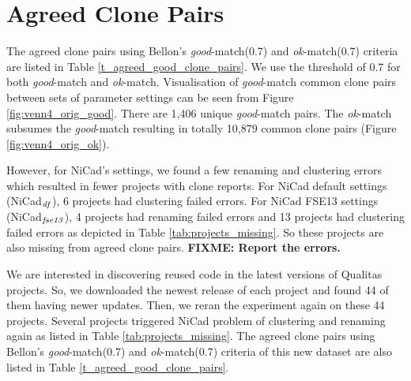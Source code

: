 \documentclass{IEEEtran}
\newcommand\FIXME[1]{\textbf{FIXME: #1}}
\begin{document}
\newpage

\section*{Agreed Clone Pairs}

The agreed clone pairs using Bellon's \textit{good}-match(0.7) and \textit{ok}-match(0.7) criteria are listed in  Table \ref{t_agreed_good_clone_pairs}. We use the threshold of 0.7 for both \textit{good}-match and \textit{ok}-match. Visualisation of \textit{good}-match common clone pairs between sets of parameter settings can be seen from Figure \ref{fig:venn4_orig_good}. There are 1,406 unique \textit{good}-match pairs. The \textit{ok}-match subsumes the \textit{good}-match resulting in totally 10,879 common clone pairs (Figure \ref{fig:venn4_orig_ok}).

However, for NiCad's settings, we found a few renaming and clustering errors which resulted in fewer projects with clone reports. For NiCad default settings (NiCad$_{\textrm{\textit{df}}}$), 6 projects had clustering failed errors. For NiCad FSE13 settings (NiCad$_{\textrm{\textit{fse13}}}$), 4 projects had renaming failed errors and 13 projects had clustering failed errors as depicted in Table \ref{tab:projects_missing}. So these projects are also missing from agreed clone pairs. \FIXME{Report the errors.}

We are interested in discovering reused code in the latest versions of Qualitas projects. So, we downloaded the newest release of each project and found 44 of them having newer updates. Then, we reran the experiment again on these 44 projects. Several projects triggered NiCad problem of clustering and renaming again as listed in Table \ref{tab:projects_missing}. The agreed clone pairs using Bellon's \textit{good}-match(0.7) and \textit{ok}-match(0.7) criteria of this new dataset are also listed in Table \ref{t_agreed_good_clone_pairs}. 
\end{document}
